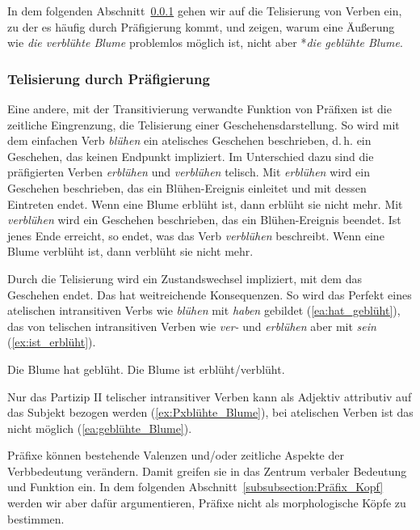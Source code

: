 In dem folgenden Abschnitt~\ref{subsubsection:Perfektivierung_Präfix} gehen wir auf die Telisierung von Verben ein, zu der es häufig durch Präfigierung kommt, und zeigen, warum eine Äußerung wie \textit{die verblühte Blume} problemlos möglich ist, nicht aber *\textit{die geblühte Blume}.


\subsubsection{Telisierung durch Präfigierung}\label{subsubsection:Perfektivierung_Präfix}

Eine andere, mit der Transitivierung verwandte Funktion von Präfixen ist die zeitliche Eingrenzung, die Telisierung einer Geschehensdarstellung. So wird mit dem einfachen Verb \textit{blühen} ein atelisches Geschehen beschrieben, d.\,h. ein Geschehen, das keinen Endpunkt impliziert. Im Unterschied dazu sind die präfigierten Verben \textit{erblühen} und \textit{verblühen} telisch. Mit \textit{erblühen} wird ein Geschehen beschrieben, das ein Blühen-Ereignis einleitet und mit dessen Eintreten endet. Wenn eine Blume erblüht ist, dann erblüht sie nicht mehr. Mit \textit{verblühen} wird ein Geschehen beschrieben, das ein Blühen-Ereignis beendet. Ist jenes Ende erreicht, so endet, was das Verb \textit{verblühen} beschreibt. Wenn eine Blume verblüht ist, dann verblüht sie nicht mehr. 

Durch die Telisierung wird ein Zustandswechsel impliziert, mit dem das Geschehen endet. Das hat weitreichende Konsequenzen. So wird das Perfekt eines atelischen intransitiven Verbs wie \textit{blühen} mit \textit{haben} gebildet (\ref{ea:hat_geblüht}), das von telischen intransitiven Verben wie \textit{ver-} und \textit{erblühen} aber mit \textit{sein} (\ref{ex:ist_erblüht}).

\ea \label{ea:Prefektivierung}
\ea \label{ea:hat_geblüht} Die Blume hat geblüht.
\ex \label{ex:ist_erblüht} Die Blume ist erblüht/verblüht.
\z 
\z 

Nur das Partizip II telischer intransitiver Verben kann als Adjektiv attributiv auf das Subjekt bezogen werden (\ref{ex:Pxblühte_Blume}), bei atelischen Verben ist das nicht möglich (\ref{ea:geblühte_Blume}).

\ea \label{ea:P2_attributiv}
\label{ea:geblühte_Blume}
\label{ex:Pxblühte_Blume}
\z 
\z 

Präfixe können bestehende Valenzen und/oder zeitliche Aspekte der Verbbedeutung verändern. Damit greifen sie in das Zentrum verbaler Bedeutung und Funktion ein. In dem folgenden Abschnitt~\ref{subsubsection:Präfix_Kopf} werden wir aber dafür argumentieren, Präfixe nicht als morphologische Köpfe zu bestimmen.


